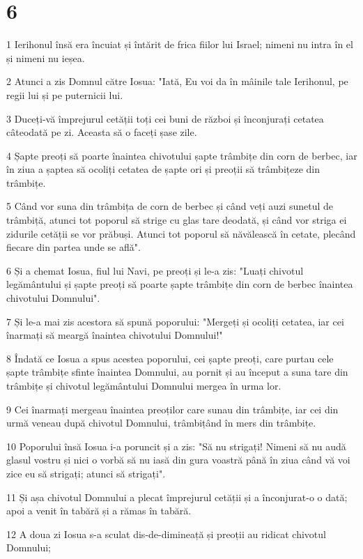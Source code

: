 \chapter{6}

\par 1 Ierihonul însă era încuiat și întărit de frica fiilor lui Israel; nimeni nu intra în el și nimeni nu ieșea.
\par 2 Atunci a zis Domnul către Iosua: "Iată, Eu voi da în mâinile tale Ierihonul, pe regii lui și pe puternicii lui.
\par 3 Duceți-vă împrejurul cetății toți cei buni de război și înconjurați cetatea câteodată pe zi. Aceasta să o faceți șase zile.
\par 4 Șapte preoți să poarte înaintea chivotului șapte trâmbițe din corn de berbec, iar în ziua a șaptea să ocoliți cetatea de șapte ori și preoții să trâmbițeze din trâmbițe.
\par 5 Când vor suna din trâmbița de corn de berbec și când veți auzi sunetul de trâmbiță, atunci tot poporul să strige cu glas tare deodată, și când vor striga ei zidurile cetății se vor prăbuși. Atunci tot poporul să năvălească în cetate, plecând fiecare din partea unde se află".
\par 6 Și a chemat Iosua, fiul lui Navi, pe preoți și le-a zis: "Luați chivotul legământului și șapte preoți să poarte șapte trâmbițe din corn de berbec înaintea chivotului Domnului".
\par 7 Și le-a mai zis acestora să spună poporului: "Mergeți și ocoliți cetatea, iar cei înarmați să meargă înaintea chivotului Domnului!"
\par 8 Îndată ce Iosua a spus acestea poporului, cei șapte preoți, care purtau cele șapte trâmbițe sfinte înaintea Domnului, au pornit și au început a suna tare din trâmbițe și chivotul legământului Domnului mergea în urma lor.
\par 9 Cei înarmați mergeau înaintea preoților care sunau din trâmbițe, iar cei din urmă veneau după chivotul Domnului, trâmbițând în mers din trâmbițe.
\par 10 Poporului însă Iosua i-a poruncit și a zis: "Să nu strigați! Nimeni să nu audă glasul vostru și nici o vorbă să nu iasă din gura voastră până în ziua când vă voi zice eu să strigați; atunci să strigați".
\par 11 Și așa chivotul Domnului a plecat împrejurul cetății și a înconjurat-o o dată; apoi a venit în tabără și a rămas în tabără.
\par 12 A doua zi Iosua s-a sculat dis-de-dimineață și preoții au ridicat chivotul Domnului;
